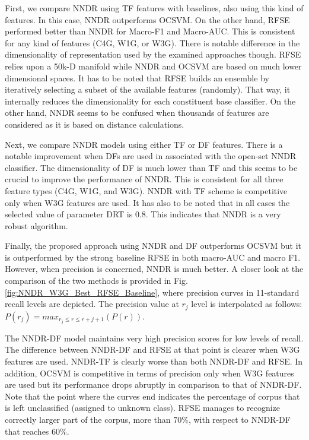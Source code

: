 \documentclass{llncs}
\begin{document}
First, we compare NNDR using TF features with baselines, also using this kind of features. In this case, NNDR outperforms OCSVM. On the other hand, RFSE performed better than NNDR for Macro-F1 and Macro-AUC. This is consistent for any kind of features (C4G, W1G, or W3G). There is notable difference in the dimensionality of representation used by the examined approaches though. RFSE relies upon a 50k-D manifold while NNDR and OCSVM are based on much lower dimensional spaces. It has to be noted that RFSE builds an ensemble by iteratively selecting a subset of the available features (randomly). That way, it internally reduces the dimensionality for each constituent base classifier. On the other hand, NNDR seems to be confused when thousands of features are considered as it is based on distance calculations. 

Next, we compare NNDR models using either TF or DF features. There is a notable improvement when DFs are used in associated with the open-set NNDR classifier. The dimensionality of DF is much lower than TF and this seems to be crucial to improve the performance of NNDR. This is consistent for all three feature types (C4G, W1G, and W3G). NNDR with TF scheme is competitive only when W3G features are used. It has also to be noted that in all cases the selected value of parameter DRT is 0.8. This indicates that NNDR is a very robust algorithm.

Finally, the proposed approach using NNDR and DF outperforms OCSVM but it is outperformed by the strong baseline RFSE in both macro-AUC and macro F1. However, when precision is concerned, NNDR is much better. A closer look at  the comparison of the two methods is provided in Fig. \ref{fig:NNDR_W3G_Best_RFSE_Baseline}, where precision curves in 11-standard recall levels are depicted. The precision value at $r_j$ level is interpolated as follows: $P(r_j)=max_{r_j \leq r \leq r+{j+1}}(P(r))$.

The NNDR-DF model maintains very high precision scores for low levels of recall. The difference between NNDR-DF and RFSE at that point is clearer when W3G features are used. NNDR-TF is clearly worse than both NNDR-DF and RFSE. In addition, OCSVM is competitive in terms of precision only when W3G features are used but its performance drops abruptly in comparison to that of NNDR-DF. Note that the point where the curves end indicates the percentage of corpus that is left unclassified (assigned to unknown class). RFSE manages to recognize correctly larger part of the corpus, more than $70\%$, with respect to NNDR-DF that reaches $60\%$. 
\end{document}
